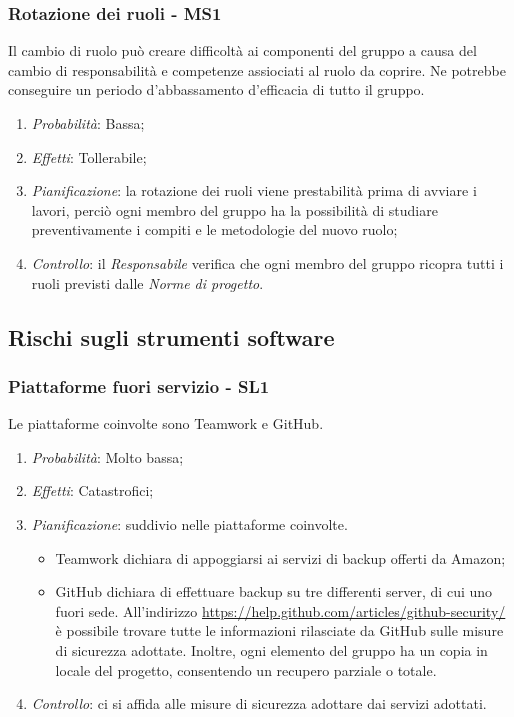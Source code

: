 \subsubsection{Rotazione dei ruoli - MS1}
Il cambio di ruolo pu\`o creare difficolt\`a ai componenti del gruppo a causa del cambio di responsabilit\`a e competenze assiociati al ruolo da coprire. Ne potrebbe conseguire un periodo d'abbassamento d'efficacia di tutto il gruppo.
\begin{enumerate}
\item \textit{Probabilit\`a}: Bassa;
\item \textit{Effetti}: Tollerabile;
\item \textit{Pianificazione}: la rotazione dei ruoli viene prestabilit\`a prima di avviare i lavori, perci\`o ogni membro del gruppo ha la possibilit\`a di studiare preventivamente i compiti e le metodologie del nuovo ruolo;
\item \textit{Controllo}: il \textit{Responsabile} verifica che ogni membro del gruppo ricopra tutti i ruoli previsti dalle \textit{Norme di progetto}.
\end{enumerate}

\subsection{Rischi sugli strumenti software}
\subsubsection{Piattaforme fuori servizio - SL1}
Le piattaforme coinvolte sono Teamwork e GitHub.
\begin{enumerate}
\item \textit{Probabilit\`a}: Molto bassa;
\item \textit{Effetti}: Catastrofici;
\item \textit{Pianificazione}: suddivio nelle piattaforme coinvolte.
  \begin{itemize}
    \item Teamwork dichiara di appoggiarsi ai servizi di backup offerti da Amazon;
    \item GitHub dichiara di effettuare backup su tre differenti server, di cui uno fuori sede. All'indirizzo \href{https://help.github.com/articles/github-security/}{https://help.github.com/articles/github-security/} \`e possibile trovare tutte le informazioni rilasciate da GitHub sulle misure di sicurezza adottate. Inoltre, ogni elemento del gruppo ha un copia in locale del progetto, consentendo un recupero parziale o totale.
  \end{itemize}
\item \textit{Controllo}: ci si affida alle misure di sicurezza adottare dai servizi adottati.
\end{enumerate}

